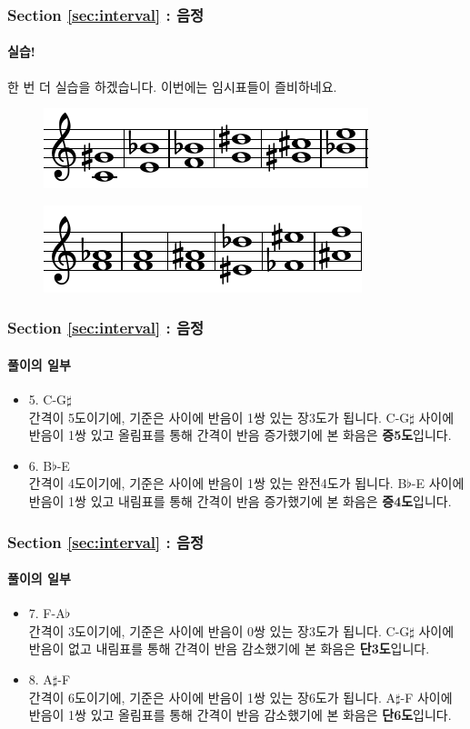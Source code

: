 \documentclass{beamer}
\begin{document}
	\begin{frame}
		\frametitle{Section \ref{sec:interval} : 음정}
		\framesubtitle{실습!}
		한 번 더 실습을 하겠습니다. 이번에는 임시표들이 즐비하네요.
		\vskip -1pc
		\begin{figure}
			\centering
			\includegraphics[width=\textwidth]{res/pdf/6/test/q3.pdf}
		\end{figure}
		\vskip -1.5pc
		\begin{figure}
			\centering
			\includegraphics[width=\textwidth]{res/pdf/6/test/q4.pdf}
		\end{figure}
	\end{frame}
	
	\begin{frame}
		\frametitle{Section \ref{sec:interval} : 음정}
		\framesubtitle{풀이의 일부}
		\begin{itemize}
			\item 5. C-G$\sharp$\\
			간격이 5도이기에, 기준은 사이에 반음이 1쌍 있는 장3도가 됩니다. C-G$\sharp$ 사이에 반음이 1쌍 있고 올림표를 통해 간격이 반음 증가했기에 본 화음은 {\bf 증5도}입니다.
			\item 6. B$\flat$-E\\
			간격이 4도이기에, 기준은 사이에 반음이 1쌍 있는 완전4도가 됩니다. B$\flat$-E 사이에 반음이 1쌍 있고 내림표를 통해 간격이 반음 증가했기에 본 화음은 {\bf 증4도}입니다.
		\end{itemize}
	\end{frame}
	
	\begin{frame}
		\frametitle{Section \ref{sec:interval} : 음정}
		\framesubtitle{풀이의 일부}
		\begin{itemize}
			\item 7. F-A$\flat$\\
			간격이 3도이기에, 기준은 사이에 반음이 0쌍 있는 장3도가 됩니다. C-G$\sharp$ 사이에 반음이 없고 내림표를 통해 간격이 반음 감소했기에 본 화음은 {\bf 단3도}입니다.
			\item 8. A$\sharp$-F\\
			간격이 6도이기에, 기준은 사이에 반음이 1쌍 있는 장6도가 됩니다. A$\sharp$-F 사이에 반음이 1쌍 있고 올림표를 통해 간격이 반음 감소했기에 본 화음은 {\bf 단6도}입니다.
		\end{itemize}
	\end{frame}
	
\end{document}
